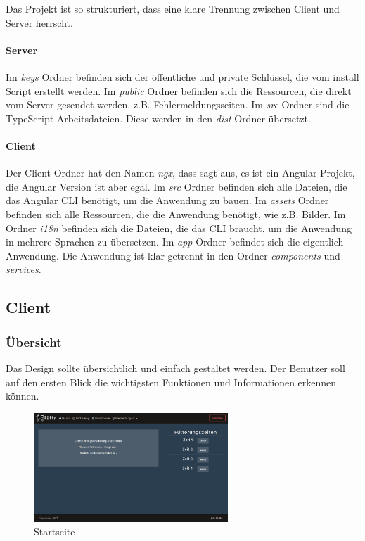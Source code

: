 Das Projekt ist so strukturiert, dass eine klare Trennung zwischen Client und Server herrscht.
\paragraph*{Server} Im \textit{keys} Ordner befinden sich der öffentliche und private Schlüssel, die vom install Script erstellt werden. Im \textit{public} Ordner befinden sich die Ressourcen, die direkt vom Server gesendet werden, z.B. Fehlermeldungsseiten. Im \textit{src} Ordner sind die TypeScript Arbeitsdateien. Diese werden in den \textit{dist} Ordner übersetzt.
\paragraph*{Client} Der Client Ordner hat den Namen \textit{ngx}, dass sagt aus, es ist ein Angular Projekt, die Angular Version ist aber egal. Im \textit{src} Ordner befinden sich alle Dateien, die das Angular \ac{CLI} benötigt, um die Anwendung zu bauen. Im \textit{assets} Ordner befinden sich alle Ressourcen, die die Anwendung benötigt, wie z.B. Bilder. Im Ordner \textit{i18n} befinden sich die Dateien, die das \ac{CLI} braucht, um die Anwendung in mehrere Sprachen zu übersetzen. Im \textit{app} Ordner befindet sich die eigentlich Anwendung. Die Anwendung ist klar getrennt in den Ordner \textit{components} und \textit{services}.

\subsection{Client}
\label{sec:ums-client}

\subsubsection{Übersicht}
\label{sec:ums-client-ubersicht}
Das Design sollte übersichtlich und einfach gestaltet werden. Der Benutzer soll auf den ersten Blick die wichtigsten Funktionen und Informationen erkennen können. \\

\begin{figure}
\vspace{-10pt}
  \begin{center}
    \includegraphics[width=0.65\textwidth]{Bilder/Greistorfer/Home}
  \end{center}
  \caption{Startseite}
  \label{Startseite}
  \vspace{-10pt}
\end{figure}

